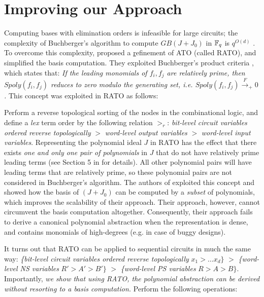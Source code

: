 \section{Improving our Approach}
\label{sec:improve}

Computing \Grobner bases with elimination orders is infeasible for
large circuits; the complexity of Buchberger's algorithm to compute
$GB(J + J_0)$ in ${\mathbb{F}}_{q}$ is $q^{O(d)}$ \cite{lv:tcad2013}. 
To overcome this complexity, \cite{pruss:dac14} proposed a
\underline{r}efinement of ATO (called RATO), and simplified the
\Grobner basis computation. They exploited Buchberger's product
criteria \cite{productc:1979}, which states that: {\it If the leading  
monomials of $f_i, f_j$ are relatively prime, then $Spoly(f_i, f_j)$
reduces to zero modulo the generating set, i.e. $Spoly(f_i, f_j)
\xrightarrow{F} _+ 0$.} This concept was exploited in RATO as follows: 

Perform a reverse topological sorting of the nodes in the
combinational logic, and define a {\it lex} term order by the
following relation $>_{r}$: {\it bit-level circuit variables ordered
  reverse topologically} $>$  {\it word-level output variables} $>$
{\it word-level input   variables}. Representing the polynomial ideal
$J$ in RATO has the effect that there exists {\it one and only one
  pair of polynomials} in $J$ that do not have relatively prime
leading terms (see  Section 5 in \cite{pruss:dac14} for details). All
other polynomial pairs will have leading terms that are 
relatively prime, so these polynomial pairs are not considered in
Buchberger's algorithm.  The authors of \cite{pruss:dac14} exploited
this concept and showed how the \Grobner basis of $(J + J_0)$ can be
computed by a {\it subset} of polynomials, which  improves the
scalability of their approach. Their approach, however, cannot
circumvent the \Grobner basis computation altogether. Consequently, 
their approach fails to derive a canonical polynomial abstraction when
the representation is dense, and contains monomials of high-degrees
(e.g. in case of buggy designs). 

It turns out that RATO can be applied to sequential circuits in much
the same way: {\it \{bit-level circuit variables ordered
  reverse topologically} $x_1 > \dots x_d\}$ $>$  {\it \{word-level NS
  variables} $R'> A'> B'\}$ $>$ {\it \{word-level PS variables}
$R>A>B\}$. Importantly, {\it we show that using RATO, the polynomial
abstraction can be derived without resorting to a \Grobner basis
computation.} Perform the following operations: 

